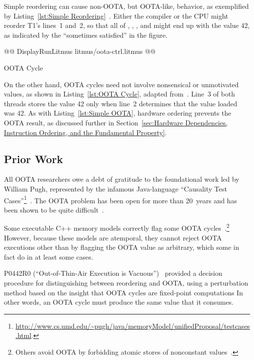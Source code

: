 Simple reordering can cause non-OOTA, but OOTA-like, behavior, as
exemplified by
Listing~\ref{lst:Simple Reordering}~\cite{PaulEMcKenney2014OOTA}.
Either the compiler or the CPU might reorder T1's lines~1 and~2, so that
all of , , , and  might end up with the value 42,
as indicated by the ``sometimes satisfied'' in the figure.

\begin{listing}[tbp]
@@ DisplayRunLitmus litmus/oota-ctrl.litmus @@
\caption{OOTA Cycle}
\label{lst:OOTA Cycle}
\end{listing}

On the other hand, OOTA cycles need not involve nonsensical or
unmotivated values, as shown in
Listing~\ref{lst:OOTA Cycle}, adapted from~\cite{PaulEMcKenney2014OOTA}.
Line~3 of both threads stores the value 42 only when line~2 determines
that the value loaded was 42.
As with Listing~\ref{lst:Simple OOTA}, hardware ordering prevents the
OOTA result, as discussed further in
Section~\ref{sec:Hardware Dependencies, Instruction Ordering, and the Fundamental Property}.

\subsection{Prior Work}
\label{sec:Prior Work}

All OOTA researchers owe a debt of gratitude to the foundational work led
by William Pugh, represented by the infamous Java-language
``Causality Test Cases''\footnote{
	\url{http://www.cs.umd.edu/~pugh/java/memoryModel/unifiedProposal/testcases.html}.}~\cite{JeremyManson2005JavaMemoryModel}.
The OOTA problem has been open for more than 20~years and has been shown
to be quite difficult~\cite{MarkBatty2015OOTAisHard,PaulEMcKenney2023P3046R2/OOTAwithoutTrying}.

Some executable C++ memory models correctly flag some OOTA
cycles~\cite{JadeAlglave2014HerdingCats}.\footnote{
	Others avoid OOTA by forbidding atomic stores of nonconstant
	values~\cite{MarkBatty2011cppmem}.}
However, because these models are atemporal, they cannot reject
OOTA executions other than by flagging the OOTA value as arbitrary,
which some in fact do in at least some cases.

P0442R0 (``Out-of-Thin-Air Execution is Vacuous'')~\cite{PaulEMcKenney2016OOTA}
provided a decision procedure for distinguishing between reordering and
OOTA, using a perturbation method based on the insight that OOTA cycles
are fixed-point computations
In other words, an OOTA cycle must produce the same value that it
consumes.

